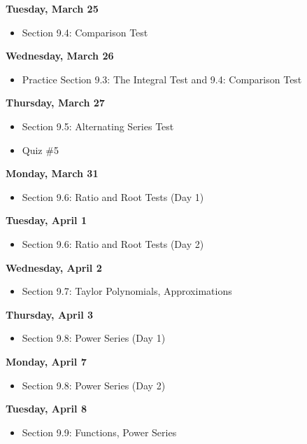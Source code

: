 \documentclass[11pt]{article}
\begin{document}
\textbf{Tuesday, March 25}

\begin{itemize}
\item Section 9.4: Comparison Test
\end{itemize}

\textbf{Wednesday, March 26}

\begin{itemize}
\item Practice Section 9.3: The Integral Test and 9.4: Comparison Test
\end{itemize}

\textbf{Thursday, March 27}

\begin{itemize}
\item Section 9.5: Alternating Series Test
\item Quiz \#5
\end{itemize}

\textbf{Monday, March 31}

\begin{itemize}
\item Section 9.6: Ratio and Root Tests (Day 1)
\end{itemize}

\textbf{Tuesday, April 1}

\begin{itemize}
\item Section 9.6: Ratio and Root Tests (Day 2)
\end{itemize}

\textbf{Wednesday, April 2}

\begin{itemize}
\item Section 9.7: Taylor Polynomials, Approximations
\end{itemize}

\textbf{Thursday, April 3}

\begin{itemize}
\item Section 9.8: Power Series (Day 1)
\end{itemize}

\textbf{Monday, April 7}

\begin{itemize}
\item Section 9.8: Power Series (Day 2)
\end{itemize}

\textbf{Tuesday, April 8}

\begin{itemize}
\item Section 9.9: Functions, Power Series
\end{itemize}
\end{document}
